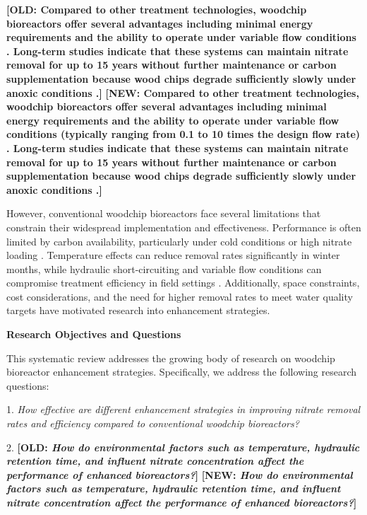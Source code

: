 \documentclass[12pt,a4paper]{article}
\newcommand{\replaced}[2]{\textcolor{deletedtext}{\textbf{[OLD: #1]}} \textcolor{replacedtext}{\textbf{[NEW: #2]}}}
\begin{document}
\replaced{Compared to other treatment technologies, woodchip bioreactors offer several advantages including minimal energy requirements and the ability to operate under variable flow conditions \citep{RN625, RN310}. Long-term studies indicate that these systems can maintain nitrate removal for up to 15 years without further maintenance or carbon supplementation because wood chips degrade sufficiently slowly under anoxic conditions \citep{RN625, RN629}.}{Compared to other treatment technologies, woodchip bioreactors offer several advantages including minimal energy requirements and the ability to operate under variable flow conditions (typically ranging from 0.1 to 10 times the design flow rate) \citep{RN625, RN310}. Long-term studies indicate that these systems can maintain nitrate removal for up to 15 years without further maintenance or carbon supplementation because wood chips degrade sufficiently slowly under anoxic conditions \citep{RN625, RN629}.}

However, conventional woodchip bioreactors face several limitations that constrain their widespread implementation and effectiveness. Performance is often limited by carbon availability, particularly under cold conditions or high nitrate loading \citep{RN625, RN228, RN258}. Temperature effects can reduce removal rates significantly in winter months, while hydraulic short-circuiting and variable flow conditions can compromise treatment efficiency in field settings \citep{RN228, RN309}. Additionally, space constraints, cost considerations, and the need for higher removal rates to meet water quality targets have motivated research into enhancement strategies.

\textbf{Research Objectives and Questions}

This systematic review addresses the growing body of research on woodchip bioreactor enhancement strategies. Specifically, we address the following research questions:

1. \textit{How effective are different enhancement strategies in improving nitrate removal rates and efficiency compared to conventional woodchip bioreactors?}

2. \replaced{\textit{How do environmental factors such as temperature, hydraulic retention time, and influent nitrate concentration affect the performance of enhanced bioreactors?}}{\textit{How do environmental factors such as temperature, hydraulic retention time, and influent nitrate concentration affect the performance of enhanced bioreactors?}}
\end{document}
